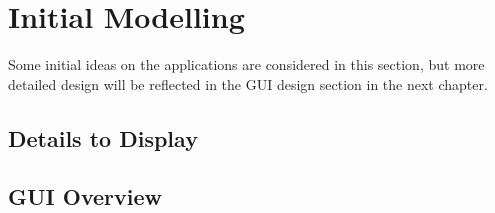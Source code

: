 \section{Initial Modelling}
Some initial ideas on the applications are considered in this section, but more detailed design will be reflected in the GUI design section in the next chapter.

\subsection{Details to Display}


\subsection{GUI Overview}



